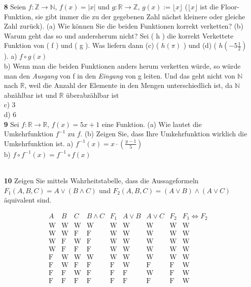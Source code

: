 \documentclass[11pt]{article}
\begin{document}
    \textbf{8} Seien \( f : \mathbb{Z} \rightarrow \mathbb{N} \), \( f(x) = |x| \) und \( g : \mathbb{R} \rightarrow \mathbb{Z} \), \( g(x) := \lfloor x \rfloor \) (\(\lfloor x \rfloor\) ist die Floor-Funktion, sie gibt immer die zu der gegebenen Zahl nächst kleinere oder gleiche Zahl zurück).
    (a) Wie können Sie die beiden Funktionen korrekt verketten? (b) Warum geht das so und andersherum nicht?
    Sei ( h ) die korrekt Verkettete Funktion von ( f ) und ( g ). Was liefern dann (c) ( $h(\pi)$ ) und (d) ( $h(-5\frac{1}{2})$ ).\newline
    a) \( f \circ g(x) \)\\
    b) Wenn man die beiden Funktionen anders herum verketten würde, so würde man den \textit{Ausgang} von f in den \textit{Eingang} von g leiten. Und das geht nicht von $\mathbb{N}$ nach $\mathbb{R}$, weil die Anzahl der Elemente in den Mengen unterschiedlich ist, da $\mathbb{N}$ abzählbar ist und $\mathbb{R}$ überabzählbar ist\\
    c) 3\\
    d) 6\\

    \textbf{9} Sei \( f : \mathbb{R} \rightarrow \mathbb{R} \), \( f(x) = 5x + 1 \) eine Funktion. (a) Wie lautet die Umkehrfunktion $f^{-1}$ zu $f$. (b) Zeigen Sie, dass Ihre Umkehrfunktion wirklich die Umkehrfunktion ist.\newline
    a) $f^{-1}(x) = x \cdot (\frac{y-1}{5})$\\
    b) \(f \circ f^{-1}(x) = f^{-1} \circ f(x)\)\\\

    \textbf{10} Zeigen Sie mittels Wahrheitstabelle, dass die Aussageformeln \(F_1(A,B,C) = A \lor (B \land C)\) und \(F_2(A,B,C) = (A \lor B) \land (A \lor C)\) äquivalent sind.

\[
    \begin{array}{ccc|c|c|c|c|c|c|c}
        A & B & C & B \land C & F_1 & A \lor B & A \lor C & F_2 & F_1 \Leftrightarrow F_2 \\
        \hline
        \text{W} & \text{W} & \text{W} & \text{W} & \text{W} & \text{W} & \text{W} & \text{W} & \text{W} \\
        \text{W} & \text{W} & \text{F} & \text{F} & \text{W} & \text{W} & \text{W} & \text{W} & \text{W} \\
        \text{W} & \text{F} & \text{W} & \text{F} & \text{W} & \text{W} & \text{W} & \text{W} & \text{W} \\
        \text{W} & \text{F} & \text{F} & \text{F} & \text{W} & \text{W} & \text{W} & \text{W} & \text{W} \\
        \text{F} & \text{W} & \text{W} & \text{W} & \text{W} & \text{W} & \text{W} & \text{W} & \text{W} \\
        \text{F} & \text{W} & \text{F} & \text{F} & \text{F} & \text{W} & \text{F} & \text{F} & \text{W} \\
        \text{F} & \text{F} & \text{W} & \text{F} & \text{F} & \text{F} & \text{W} & \text{F} & \text{W} \\
        \text{F} & \text{F} & \text{F} & \text{F} & \text{F} & \text{F} & \text{F} & \text{F} & \text{W} \\
    \end{array}
\]
\end{document}
